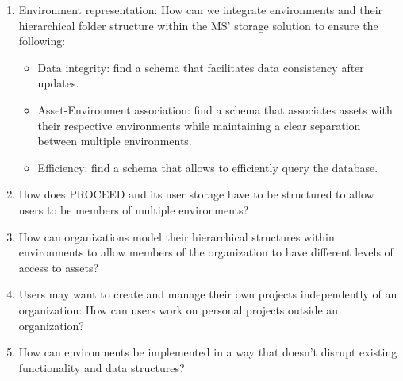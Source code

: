 \begin{enumerate}

	\item Environment representation: How can we integrate environments and their hierarchical
	      folder structure within the MS' storage solution to ensure the following:
	      \begin{itemize}
		      \item Data integrity: find a schema that facilitates data consistency after updates.
		      \item Asset-Environment association: find a schema that associates assets with their
		            respective environments while maintaining a clear separation between
		            multiple environments.
		      \item Efficiency: find a schema that allows to efficiently query the database.
	      \end{itemize}

	\item How does PROCEED and its user storage have to be structured to allow users to be
	      members of multiple environments?

	\item How can organizations model their hierarchical structures within environments
	      to allow members of the organization to have different levels of access to assets?

	\item Users may want to create and manage their own projects independently of an
	      organization: How can users work on personal projects outside an organization?

	\item How can environments be implemented in a way that doesn't disrupt existing
	      functionality and data structures?





\end{enumerate}
